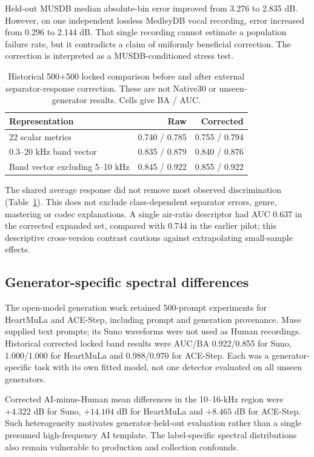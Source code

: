 Held-out MUSDB median absolute-bin error improved from 3.276 to 2.835 dB.
However, on one independent lossless MedleyDB vocal recording, error increased
from 0.296 to 2.144 dB. That single recording cannot estimate a population
failure rate, but it contradicts a claim of uniformly beneficial correction.
The correction is interpreted as a MUSDB-conditioned stress test.

\begin{table}[htbp]
\centering\small
\caption{Historical 500+500 locked comparison before and after external
separator-response correction. These are not Native30 or unseen-generator
results. Cells give BA / AUC.}
\label{tab:separator-correction}
\begin{tabular}{lrr}
\toprule
Representation & Raw & Corrected\\
\midrule
22 scalar metrics & 0.740 / 0.785 & 0.755 / 0.794\\
0.3--20 kHz band vector & 0.835 / 0.879 & 0.840 / 0.876\\
Band vector excluding 5--10 kHz & 0.845 / 0.922 & 0.855 / 0.922\\
\bottomrule
\end{tabular}
\end{table}

The shared average response did not remove most observed discrimination
(Table~\ref{tab:separator-correction}). This does not exclude class-dependent
separator errors, genre, mastering or codec explanations. A single air-ratio
descriptor had AUC 0.637 in the corrected expanded set, compared with 0.744
in the earlier pilot; this descriptive cross-version contrast cautions against
extrapolating small-sample effects.

\subsection{Generator-specific spectral differences}

The open-model generation work retained 500-prompt experiments for HeartMuLa
and ACE-Step, including prompt and generation provenance. Muse supplied text
prompts; its Suno waveforms were not used as Human recordings. Historical
corrected locked band results were AUC/BA 0.922/0.855 for Suno, 1.000/1.000
for HeartMuLa and 0.988/0.970 for ACE-Step. Each was a generator-specific
task with its own fitted model, not one detector evaluated on all unseen
generators.

Corrected AI-minus-Human mean differences in the 10--16-kHz region were
$+4.322$ dB for Suno, $+14.104$ dB for HeartMuLa and $+8.465$ dB for
ACE-Step. Such heterogeneity motivates generator-held-out evaluation rather
than a single presumed high-frequency AI template. The label-specific
spectral distributions also remain vulnerable to production and collection
confounds.

